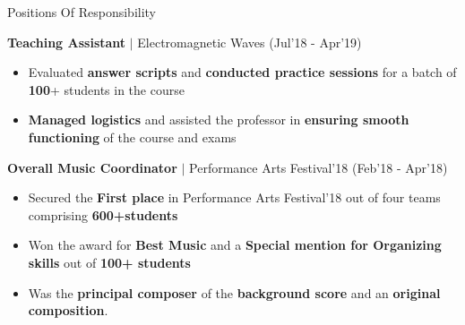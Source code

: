 \documentclass{resume}
\newcommand{\sepval}{-0.5em}
\begin{document}

\vspace{-0.2cm}

\begin{rSection}{Positions Of Responsibility}

\vspace{-0.4cm}

	\item {\bf{Teaching Assistant}} $\mid$ Electromagnetic Waves
		\hfill{(Jul'18 - Apr'19)}
		
		\vspace{-0.2cm}

		\begin{itemize}[leftmargin=*]
			
			\itemsep \sepval
				
			\item Evaluated {\bf answer scripts} and {\bf conducted practice sessions} for a batch of {\bf{100}}+ students in the course

			\item {\bf Managed logistics} and assisted the professor in {\bf ensuring smooth functioning} of the course and exams

	

		\end{itemize}

	\vspace{-0.1cm}

	\item {\bf{Overall Music Coordinator}} $\mid$ Performance Arts Festival'18 \hfill{(Feb'18 - Apr'18)}

		\vspace{-0.2cm}

		\begin{itemize}[leftmargin=*]
			
			\itemsep \sepval
		
			\item Secured the {\bf First place} in Performance Arts Festival'18 out of four teams comprising {\bf 600+students}
 
			\item Won the award for {\bf{Best Music}} and a {\bf Special mention for Organizing skills} out of {\bf 100+ students}	

			\item Was the {\bf{principal composer}} of the {\bf{background score}} and an {\bf{original composition}}. 
	
		\end{itemize}

\end{rSection}
\end{document}
